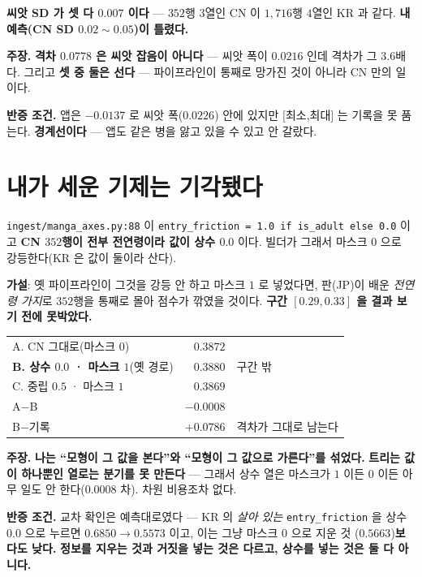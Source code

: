 \documentclass[10pt,a4paper]{article}
\newcommand{\claim}[2]{\begin{claimbox}\textbf{주장.} #1\par\smallskip
  \textcolor{gray!70}{\textbf{반증 조건.} #2}\end{claimbox}}
\begin{document}
\textbf{씨앗 SD 가 셋 다 $0.007$ 이다} --- $352$행 $3$열인 CN 이 $1{,}716$행 $4$열인
KR 과 같다. \textbf{내 예측(CN SD $0.02{\sim}0.05$)이 틀렸다.}

\claim{\textbf{격차 $0.0778$ 은 씨앗 잡음이 아니다} --- 씨앗 폭이 $0.0216$ 인데
격차가 그 $3.6$배다. 그리고 \textbf{셋 중 둘은 선다} --- 파이프라인이 통째로
망가진 것이 아니라 CN 만의 일이다.}
{앱은 $-0.0137$ 로 씨앗 폭($0.0226$) 안에 있지만 $[$최소,최대$]$ 는 기록을 못
품는다. \textbf{경계선이다} --- 앱도 같은 병을 앓고 있을 수 있고 안 갈랐다.}

\section{내가 세운 기제는 기각됐다}

\texttt{ingest/manga\_axes.py:88} 이 \texttt{entry\_friction = 1.0 if is\_adult
else 0.0} 이고 \textbf{CN $352$행이 전부 전연령이라 값이 상수 $0.0$} 이다. 빌더가
그래서 마스크 $0$ 으로 강등한다(KR 은 값이 둘이라 산다).

\textbf{가설}: 옛 파이프라인이 그것을 강등 안 하고 마스크 $1$ 로 넣었다면, 판(JP)이
배운 \emph{전연령 가지}로 $352$행을 통째로 몰아 점수가 깎였을 것이다.
\textbf{구간 $[0.29, 0.33]$ 을 결과 보기 전에 못박았다.}

\begin{center}
\begin{tabular}{lrl}
\toprule
A. CN 그대로(마스크 $0$) & $0.3872$ & \\
\textbf{B. 상수 $0.0$ · 마스크 $1$}(옛 경로) & $\mathbf{0.3880}$ & \textcolor{BrickRed}{구간 밖} \\
C. 중립 $0.5$ · 마스크 $1$ & $0.3869$ & \\
\midrule
A$-$B & $-0.0008$ & \\
B$-$기록 & $\mathbf{+0.0786}$ & 격차가 그대로 남는다 \\
\bottomrule
\end{tabular}
\end{center}

\claim{\textbf{나는 ``모형이 그 값을 본다''와 ``모형이 그 값으로 가른다''를 섞었다.}
\textbf{트리는 값이 하나뿐인 열로는 분기를 못 만든다} --- 그래서 상수 열은 마스크가
$1$ 이든 $0$ 이든 아무 일도 안 한다($0.0008$ 차). 차원 비용조차 없다.}
{교차 확인은 예측대로였다 --- KR 의 \emph{살아 있는} \texttt{entry\_friction} 을
상수 $0.0$ 으로 누르면 $0.6850 \to 0.5573$ 이고, 이는 그냥 마스크 $0$ 으로 지운 것
($0.5663$)\textbf{보다도 낮다.} \textbf{정보를 지우는 것과 거짓을 넣는 것은 다르고,
상수를 넣는 것은 둘 다 아니다.}}
\end{document}
